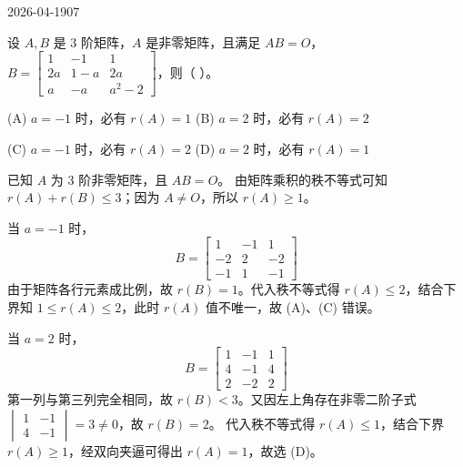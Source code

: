 \begin{mistake}{2026-04-19}{07}

\begin{problemcontent}
设 \(A, B\) 是 3 阶矩阵，\(A\) 是非零矩阵，且满足 \(AB = O\)，\(B = \begin{bmatrix} 1 & -1 & 1 \\ 2a & 1-a & 2a \\ a & -a & a^2-2 \end{bmatrix}\)，则（ \quad ）。

(A) \(a=-1\) 时，必有 \(r(A)=1\) \qquad (B) \(a=2\) 时，必有 \(r(A)=2\)

(C) \(a=-1\) 时，必有 \(r(A)=2\) \qquad (D) \(a=2\) 时，必有 \(r(A)=1\)
\end{problemcontent}

\begin{solutioncontent}
已知 \(A\) 为 3 阶非零矩阵，且 \(AB=O\)。
由矩阵乘积的秩不等式可知 \(r(A)+r(B) \le 3\)；因为 \(A \neq O\)，所以 \(r(A) \ge 1\)。

当 \(a=-1\) 时，
\[
B = \begin{bmatrix} 1 & -1 & 1 \\ -2 & 2 & -2 \\ -1 & 1 & -1 \end{bmatrix}
\]
由于矩阵各行元素成比例，故 \(r(B)=1\)。代入秩不等式得 \(r(A) \le 2\)，结合下界知 \(1 \le r(A) \le 2\)，此时 \(r(A)\) 值不唯一，故 (A)、(C) 错误。

当 \(a=2\) 时，
\[
B = \begin{bmatrix} 1 & -1 & 1 \\ 4 & -1 & 4 \\ 2 & -2 & 2 \end{bmatrix}
\]
第一列与第三列完全相同，故 \(r(B) < 3\)。又因左上角存在非零二阶子式 \(\begin{vmatrix} 1 & -1 \\ 4 & -1 \end{vmatrix} = 3 \neq 0\)，故 \(r(B)=2\)。
代入秩不等式得 \(r(A) \le 1\)，结合下界 \(r(A) \ge 1\)，经双向夹逼可得出 \(r(A)=1\)，故选 (D)。
\end{solutioncontent}


\end{mistake}
